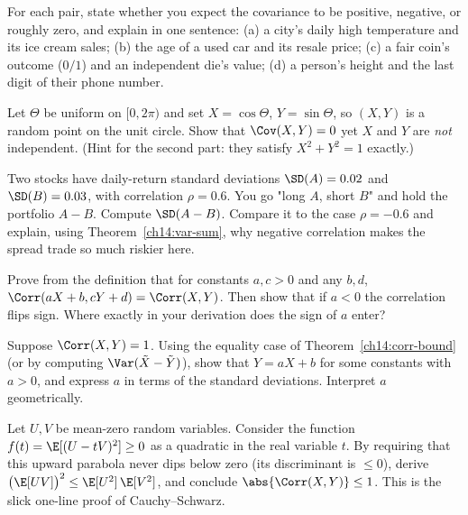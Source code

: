 \begin{exercise}
\label{ch14:ex-sign}
For each pair, state whether you expect the covariance to be positive, negative, or
roughly zero, and explain in one sentence: (a) a city's daily high temperature and
its ice cream sales; (b) the age of a used car and its resale price; (c) a fair
coin's outcome ($0/1$) and an independent die's value; (d) a person's height and the
last digit of their phone number.
\end{exercise}

\begin{exercise}
\label{ch14:ex-uncorr}
Let $\Theta$ be uniform on $[0, 2\pi)$ and set $X = \cos\Theta$, $Y = \sin\Theta$,
so $(X, Y)$ is a random point on the unit circle. Show that $\Cov(X, Y) = 0$ yet
$X$ and $Y$ are \emph{not} independent. (Hint for the second part: they satisfy
$X^2 + Y^2 = 1$ exactly.)
\end{exercise}

\begin{exercise}
\label{ch14:ex-diff}
Two stocks have daily-return standard deviations $\SD(A) = 0.02$ and $\SD(B) =
0.03$, with correlation $\rho = 0.6$. You go "long $A$, short $B$" and hold the
portfolio $A - B$. Compute $\SD(A - B)$. Compare it to the case $\rho = -0.6$ and
explain, using Theorem~\ref{ch14:var-sum}, why negative correlation makes the spread
trade so much riskier here.
\end{exercise}

\begin{exercise}
\label{ch14:ex-scale}
Prove from the definition that for constants $a, c > 0$ and any $b, d$,
$\Corr(aX + b, cY + d) = \Corr(X, Y)$. Then show that if $a < 0$ the correlation
flips sign. Where exactly in your derivation does the sign of $a$ enter?
\end{exercise}

\begin{exercise}
\label{ch14:ex-one}
Suppose $\Corr(X, Y) = 1$. Using the equality case of
Theorem~\ref{ch14:corr-bound} (or by computing $\Var(\tilde X - \tilde Y)$), show
that $Y = aX + b$ for some constants with $a > 0$, and express $a$ in terms of the
standard deviations. Interpret $a$ geometrically.
\end{exercise}

\begin{exercise}
\label{ch14:ex-cs}
Let $U, V$ be mean-zero random variables. Consider the function
$f(t) = \E[(U - tV)^2] \ge 0$ as a quadratic in the real variable $t$. By requiring
that this upward parabola never dips below zero (its discriminant is
$\le 0$), derive $\big(\E[UV]\big)^2 \le \E[U^2]\,\E[V^2]$, and conclude
$\abs{\Corr(X,Y)} \le 1$. This is the slick one-line proof of Cauchy--Schwarz.
\end{exercise}

